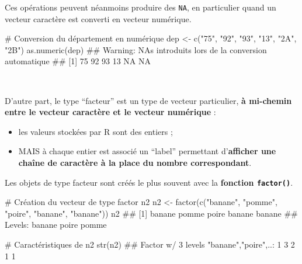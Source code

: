 \documentclass[12pt,twosided, notitlepage]{book}
\newenvironment{Shaded}{}{}
\newcommand{\KeywordTok}[1]{\textcolor[rgb]{0.00,0.00,1.00}{#1}}
\newcommand{\StringTok}[1]{\textcolor[rgb]{0.00,0.50,0.50}{#1}}
\newcommand{\CommentTok}[1]{\textcolor[rgb]{0.00,0.50,0.00}{#1}}
\newcommand{\NormalTok}[1]{#1}
\providecommand{\tightlist}{%
  \setlength{\itemsep}{0pt}\setlength{\parskip}{0pt}}
\renewenvironment{Shaded}{\begin{snugshade}}{\end{snugshade}}
\begin{document}
Ces opérations peuvent néanmoins produire des \texttt{NA}, en
particulier quand un vecteur caractère est converti en vecteur
numérique.

\begin{Shaded}
\begin{Highlighting}[]
\CommentTok{# Conversion du département en numérique}
\NormalTok{dep <-}\StringTok{ }\KeywordTok{c}\NormalTok{(}\StringTok{"75"}\NormalTok{, }\StringTok{"92"}\NormalTok{, }\StringTok{"93"}\NormalTok{, }\StringTok{"13"}\NormalTok{, }\StringTok{"2A"}\NormalTok{, }\StringTok{"2B"}\NormalTok{)}
\KeywordTok{as.numeric}\NormalTok{(dep)}
\NormalTok{  ## Warning: NAs introduits lors de la conversion automatique}
\NormalTok{  ## [1] 75 92 93 13 NA NA}
\end{Highlighting}
\end{Shaded}

~

D'autre part, le type \enquote{facteur} est un type de vecteur
particulier, \textbf{à mi-chemin entre le vecteur caractère et le
vecteur numérique} :

\begin{itemize}
\tightlist
\item
  les valeurs stockées par R sont des entiers ;
\item
  MAIS à chaque entier est associé un \enquote{label} permettant
  d'\textbf{afficher une chaîne de caractère à la place du nombre
  correspondant}.
\end{itemize}

Les objets de type facteur sont créés le plus souvent avec la
\textbf{fonction \texttt{factor()}}.

\begin{Shaded}
\begin{Highlighting}[]
\CommentTok{# Création du vecteur de type factor n2}
\NormalTok{n2 <-}\StringTok{ }\KeywordTok{factor}\NormalTok{(}\KeywordTok{c}\NormalTok{(}\StringTok{"banane"}\NormalTok{, }\StringTok{"pomme"}\NormalTok{, }\StringTok{"poire"}\NormalTok{, }\StringTok{"banane"}\NormalTok{, }\StringTok{"banane"}\NormalTok{))}
\NormalTok{n2}
\NormalTok{  ## [1] banane pomme  poire  banane banane}
\NormalTok{  ## Levels: banane poire pomme}

\CommentTok{# Caractéristiques de n2}
\KeywordTok{str}\NormalTok{(n2)}
\NormalTok{  ##  Factor w/ 3 levels "banane","poire",..: 1 3 2 1 1}
\end{Highlighting}
\end{Shaded}
\end{document}
